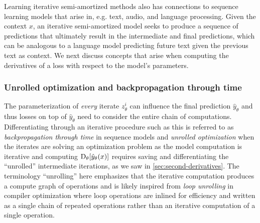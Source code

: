 \documentclass[twoside,11pt]{article}
\newcommand{\eg}{e.g.\xspace}
\begin{document}
Learning iterative semi-amortized methods also has connections to
sequence learning models that arise in, \eg text, audio,
and language processing.
Given the context $x$, an iterative semi-amortized model
seeks to produce a sequence of predictions that ultimately
result in the intermediate and final predictions,
which can be analogous to a language model predicting
future text given the previous text as context.
We next discuss concepts that arise when computing the derivatives
of a loss with respect to the model's parameters.

\subsubsection{Unrolled optimization and backpropagation through time}
\label{sec:unrolled}
\begin{center}
\end{center}
\vspace{-7mm}

The parameterization of \emph{every} iterate $z_\theta^i$ can
influence the final prediction $\hat y_\theta$ and thus
losses on top of $\hat y_\theta$ need to consider the
entire chain of computations.
Differentiating through an iterative procedure such
as this is referred to as \emph{backpropagation through time}
in sequence models and \emph{unrolled optimization}
\citep{pearlmutter2008reverse,zhang2010multi,maclaurin2015gradient,belanger2016structured,metz2016unrolled,finn2017model,han2017alternating,belanger2017end,belanger2017deep,foerster2017learning,bhardwaj2020differentiable,monga2021algorithm}
when the iterates are solving an optimization problem
as the model computation is iterative and computing
$\mathrm{D}_\theta[\hat y_\theta(x)]$
requires saving and differentiating the ``unrolled''
intermediate iterations, as we saw in \cref{sec:second-derivatives}.
The terminology ``unrolling'' here emphasizes that the
iterative computation produces a compute graph of operations
and is likely inspired from
\emph{loop unrolling} in compiler optimization
\citep{aho1986compilers,davidson1995aggressive} where
loop operations are inlined for efficiency and written
as a single chain of repeated operations rather
than an iterative computation of a single operation.
\end{document}
